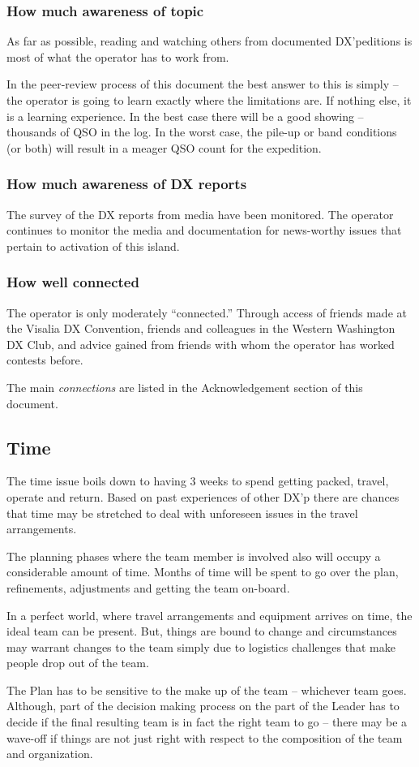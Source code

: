 \documentclass[11pt]{article}
\begin{document}
\subsubsection{How much awareness of topic}
As far as possible, reading and watching others from documented DX'peditions
is most of what the operator has to work from.
\par
In the peer-review process of this document the best answer to this
is simply -- the operator is going to learn exactly where the limitations
are.  If nothing else, it is a learning experience.  In the best case
there will be a good showing -- thousands of QSO in the log.  In the worst
case, the pile-up or band conditions (or both) will result in a meager
QSO count for the expedition.

\subsubsection{How much awareness of DX reports}

The survey of the DX reports from media have been monitored.  
The operator continues to monitor the media and documentation for news-worthy
issues that pertain to activation of this island.

\subsubsection{How well connected}
The operator is only moderately ``connected.'' Through access of friends
made at the Visalia DX Convention, friends and colleagues in the
Western Washington DX Club, and advice gained from friends with whom
the operator has worked contests before.
\par
The main {\textit{connections}} are listed in the Acknowledgement
section of this document.

\subsection{Time}
The time issue boils down to having 3 weeks
to spend getting packed, travel, operate and return.
Based on past experiences of other DX'p there are
chances that time may be stretched to deal with
unforeseen issues in the travel arrangements.
\par
The planning phases where the team member is involved
also will occupy a considerable amount of time.
Months of time will be spent to go over the plan,
refinements, adjustments and getting the team
on-board.
\par
In a perfect world, where travel arrangements
and equipment arrives on time, the ideal team
can be present.  But, things are bound to change
and circumstances may warrant changes to the team
simply due to logistics challenges that make people
drop out of the team.
\par
The Plan has to be sensitive to the make up of the
team -- whichever team goes.  Although, part of
the decision making process on the part of the Leader
has to decide if the final resulting team is in fact
the right team to go -- there may be a wave-off
if things are not just right with respect to the
composition of the team and organization.
\end{document}

